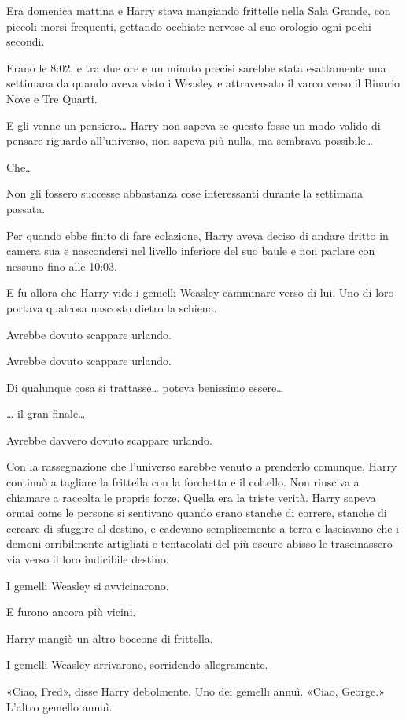 Era domenica mattina e Harry stava mangiando frittelle nella Sala Grande, con piccoli morsi frequenti, gettando occhiate nervose al suo orologio ogni pochi secondi.

Erano le 8:02, e tra due ore e un minuto precisi sarebbe stata esattamente una settimana da quando aveva visto i Weasley e attraversato il varco verso il Binario Nove e Tre Quarti.

E gli venne un pensiero… Harry non sapeva se questo fosse un modo valido di pensare riguardo all’universo, non sapeva più nulla, ma sembrava possibile…

Che…

Non gli fossero successe abbastanza cose interessanti durante la settimana passata.

Per quando ebbe finito di fare colazione, Harry aveva deciso di andare dritto in camera sua e nascondersi nel livello inferiore del suo baule e non parlare con nessuno fino alle 10:03.

E fu allora che Harry vide i gemelli Weasley camminare verso di lui. Uno di loro portava qualcosa nascosto dietro la schiena.

Avrebbe dovuto scappare urlando.

Avrebbe dovuto scappare urlando.

Di qualunque cosa si trattasse… poteva benissimo essere…

… il gran finale…

Avrebbe davvero dovuto scappare urlando.

Con la rassegnazione che l’universo sarebbe venuto a prenderlo comunque, Harry continuò a tagliare la frittella con la forchetta e il coltello. Non riusciva a chiamare a raccolta le proprie forze. Quella era la triste verità. Harry sapeva ormai come le persone si sentivano quando erano stanche di correre, stanche di cercare di sfuggire al destino, e cadevano semplicemente a terra e lasciavano che i demoni orribilmente artigliati e tentacolati del più oscuro abisso le trascinassero via verso il loro indicibile destino.

I gemelli Weasley si avvicinarono.

E furono ancora più vicini.

Harry mangiò un altro boccone di frittella.

I gemelli Weasley arrivarono, sorridendo allegramente.

«Ciao, Fred», disse Harry debolmente. Uno dei gemelli annuì. «Ciao, George.» L’altro gemello annuì.

